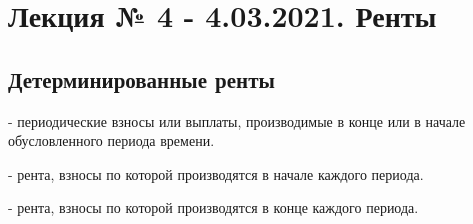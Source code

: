 \chapter{Лекция № 4 - 4.03.2021. Ренты} %
\section{Детерминированные ренты} %

\begin{definition}
	 - периодические взносы или выплаты, производимые в конце или в начале обусловленного периода времени.

	 - рента, взносы по которой производятся в начале каждого периода.

	 - рента, взносы по которой производятся в конце каждого периода.
\end{definition}

